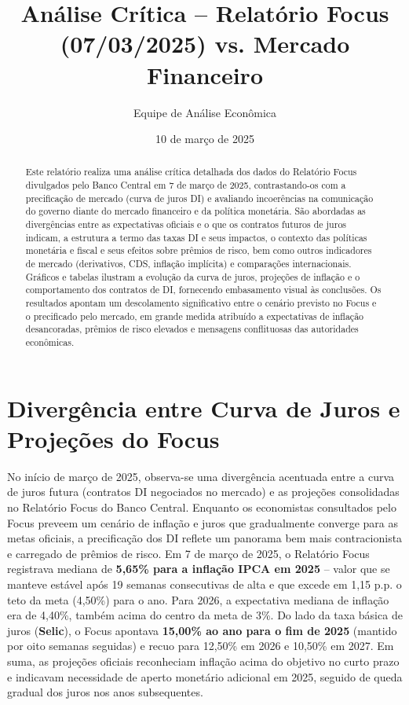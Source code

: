 \documentclass[a4paper,12pt]{article}
\begin{document}
\title{Análise Crítica -- Relatório Focus (07/03/2025) vs. Mercado Financeiro}
\author{Equipe de Análise Econômica}
\date{10 de março de 2025}
\maketitle

\begin{abstract}
Este relatório realiza uma análise crítica detalhada dos dados do Relatório Focus divulgados pelo Banco Central em 7 de março de 2025, contrastando-os com a precificação de mercado (curva de juros DI) e avaliando incoerências na comunicação do governo diante do mercado financeiro e da política monetária. São abordadas as divergências entre as expectativas oficiais e o que os contratos futuros de juros indicam, a estrutura a termo das taxas DI e seus impactos, o contexto das políticas monetária e fiscal e seus efeitos sobre prêmios de risco, bem como outros indicadores de mercado (derivativos, CDS, inflação implícita) e comparações internacionais. Gráficos e tabelas ilustram a evolução da curva de juros, projeções de inflação e o comportamento dos contratos de DI, fornecendo embasamento visual às conclusões. Os resultados apontam um descolamento significativo entre o cenário previsto no Focus e o precificado pelo mercado, em grande medida atribuído a expectativas de inflação desancoradas, prêmios de risco elevados e mensagens conflituosas das autoridades econômicas.
\end{abstract}

\section{Divergência entre Curva de Juros e Projeções do Focus}

No início de março de 2025, observa-se uma divergência acentuada entre a curva de juros futura (contratos DI negociados no mercado) e as projeções consolidadas no Relatório Focus do Banco Central. Enquanto os economistas consultados pelo Focus preveem um cenário de inflação e juros que gradualmente converge para as metas oficiais, a precificação dos DI reflete um panorama bem mais contracionista e carregado de prêmios de risco. Em 7 de março de 2025, o Relatório Focus registrava mediana de \textbf{5,65\% para a inflação IPCA em 2025} -- valor que se manteve estável após 19 semanas consecutivas de alta e que excede em 1,15 p.p. o teto da meta (4,50\%) para o ano. Para 2026, a expectativa mediana de inflação era de 4,40\%, também acima do centro da meta de 3\%. Do lado da taxa básica de juros (\textbf{Selic}), o Focus apontava \textbf{15,00\% ao ano para o fim de 2025} (mantido por oito semanas seguidas) e recuo para 12,50\% em 2026 e 10,50\% em 2027. Em suma, as projeções oficiais reconheciam inflação acima do objetivo no curto prazo e indicavam necessidade de aperto monetário adicional em 2025, seguido de queda gradual dos juros nos anos subsequentes.
\end{document}
